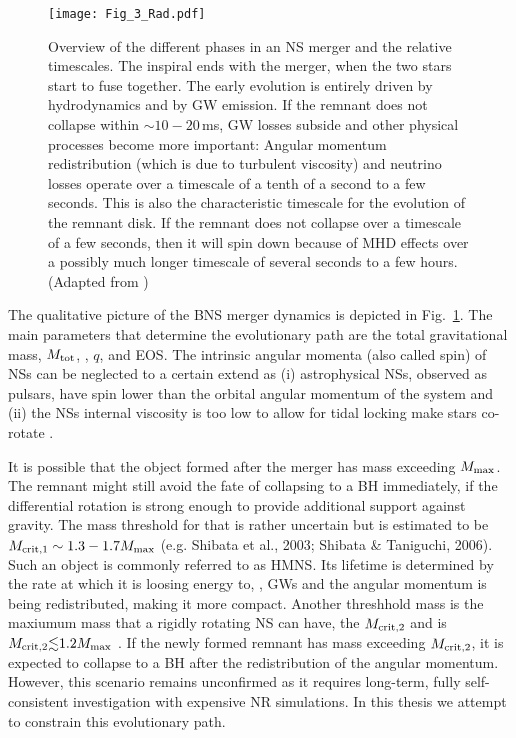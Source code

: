 \begin{figure}[t]
    \centering
    \texttt{[image: Fig\_3\_Rad.pdf]}
    \caption{
        Overview of the different phases in an NS merger and the relative timescales. 
        The inspiral ends with the merger, when the two stars start to fuse together. 
        The early \pmerg{} evolution is entirely driven by hydrodynamics and by \ac{GW} emission. 
        If the remnant does not collapse within ${\sim}10-20\,$ms, \ac{GW} losses
        subside and other physical processes become more important: 
        Angular momentum redistribution (which is due to turbulent viscosity) 
        and neutrino losses operate over a timescale of a tenth of a second to a few
        seconds. This is also the characteristic timescale for the evolution of the remnant disk. 
        If the remnant does not collapse over a timescale of a few seconds, then it will 
        spin down because of \ac{MHD} effects over a possibly much longer timescale 
        of several seconds to a few hours. 
        (Adapted from \citet{Radice:2020ddv})
    }
    \label{fig:intro:pic}
\end{figure}

The qualitative picture of the \ac{BNS} merger dynamics is depicted in Fig.~\ref{fig:intro:pic}. 
The main parameters that determine the evolutionary path are the total gravitational mass, 
$M_{\rm tot}$, \mr, $q$, and \ac{EOS}. The intrinsic angular momenta (also called spin) of \acp{NS} 
can be neglected to a certain extend as (i) astrophysical \acp{NS}, observed as pulsars, have 
spin lower than the orbital angular momentum of the system and (ii) the \acp{NS} internal 
viscosity is too low to allow for tidal locking make stars co-rotate \cite{(e.g. Bildsten & Cutler, 1992)}.

It is possible that the object formed after the merger has mass exceeding $M_{\rm max}$. 
The remnant might still avoid the fate of collapsing to a \ac{BH} immediately, if the differential 
rotation is strong enough to provide additional support against gravity. The mass threshold 
for that is rather uncertain but is estimated to be $M_{\rm crit,1}\sim1.3-1.7M_{\rm max}$ 
(e.g. Shibata et al., 2003; Shibata & Taniguchi, 2006). Such an object is commonly referred to as 
\ac{HMNS}. Its lifetime is determined by the rate at which it is loosing energy to, \eg, \acp{GW}
and the angular momentum is being redistributed, making it more compact. 
Another threshhold mass is the maxiumum mass that a rigidly rotating \ac{NS} can have, the 
$M_{\rm crit,2}$ and is $M_{\rm crit,2}{\lesssim}1.2M_{\rm max}$ \cite{Cook et al., 1994}. 
If the newly formed remnant has mass exceeding $M_{\rm crit,2}$, it is expected to collapse to 
a \ac{BH} after the redistribution of the angular momentum. However, this scenario remains 
unconfirmed as it requires long-term, fully self-consistent investigation with expensive 
\ac{NR} simulations. In this thesis we attempt to constrain this evolutionary path.


